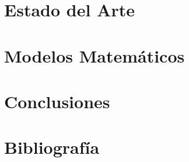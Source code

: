 \documentclass[letter, 10pt]{article}
\begin{document}
\section{Estado del Arte}
\label{sec:estado}

\section{Modelos Matemáticos}
\label{sec:modelo}

\section{Conclusiones}
\label{sec:conclusiones}

\section{Bibliografía}


\end{document}
